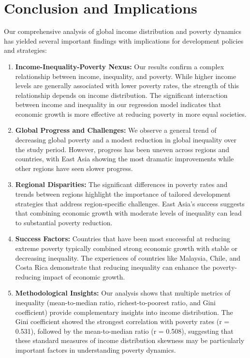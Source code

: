 \documentclass[12pt,a4paper]{article}
\begin{document}
\section{Conclusion and Implications}\label{sec:conclusion}
Our comprehensive analysis of global income distribution and poverty dynamics has yielded several important findings with implications for development policies and strategies:
\begin{enumerate}
    \item \textbf{Income-Inequality-Poverty Nexus:} Our results confirm a complex relationship between income, inequality, and poverty. While higher income levels are generally associated with lower poverty rates, the strength of this relationship depends on income distribution. The significant interaction between income and inequality in our regression model indicates that economic growth is more effective at reducing poverty in more equal societies.
    \item \textbf{Global Progress and Challenges:} We observe a general trend of decreasing global poverty and a modest reduction in global inequality over the study period. However, progress has been uneven across regions and countries, with East Asia showing the most dramatic improvements while other regions have seen slower progress.
    \item \textbf{Regional Disparities:} The significant differences in poverty rates and trends between regions highlight the importance of tailored development strategies that address region-specific challenges. East Asia's success suggests that combining economic growth with moderate levels of inequality can lead to substantial poverty reduction.
    \item \textbf{Success Factors:} Countries that have been most successful at reducing extreme poverty typically combined strong economic growth with stable or decreasing inequality. The experiences of countries like Malaysia, Chile, and Costa Rica demonstrate that reducing inequality can enhance the poverty-reducing impact of economic growth.
    \item \textbf{Methodological Insights:} Our analysis shows that multiple metrics of inequality (mean-to-median ratio, richest-to-poorest ratio, and Gini coefficient) provide complementary insights into income distribution. The Gini coefficient showed the strongest correlation with poverty rates (r = 0.531), followed by the mean-to-median ratio (r = 0.508), suggesting that these standard measures of income distribution skewness may be particularly important factors in understanding poverty dynamics.
\end{enumerate}
\end{document}
